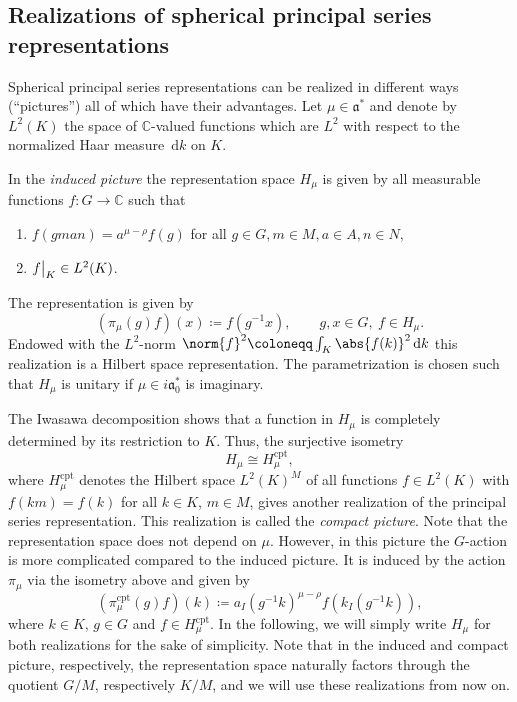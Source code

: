 \documentclass[JEP,XML,SOM,NoFloatCountersInSection,Unicode,published]{cedram}
\theoremstyle{definition}
\DeclarePairedDelimiter{\abs}\lvert\rvert
\DeclarePairedDelimiter{\norm}\lVert\rVert
\newcommand\restr[2]{{
\left.\kern-\nulldelimiterspace
#1
\vphantom{\big|}
\right|_{#2}
}}
\newcommand{\mf}[1]{\ensuremath{\mathfrak{#1}}}
\newcommand{\rhoa}{\ensuremath{\rho}}
\newcommand{\C}{\ensuremath{\mathbb{C}}}
\newcommand{\ps}[2]{\ensuremath{H_{#2}}}
\newcommand{\psc}[2]{\ensuremath{H_{#2}^{\mathrm{cpt}}}}
\newcommand{\intd}{\ensuremath{\,\mathrm{d}}}
\begin{document}
\subsection{Realizations of spherical principal series representations}
Spherical principal series representations can be realized in different ways (``pictures'') all of which have their advantages. Let $\mu\in\mf a^*$ and denote by $L^2(K)$ the space of $\C$-valued functions which are $L^2$ with respect to the normalized Haar measure $\intd k$ on $K$.

In the \emph{induced picture} the representation space $\ps{\sigma}{\mu}$ is given by all measurable functions $f:G\to \C$ such that
\begin{enumerate}
\item $f(gman)=a^{\mu-\rhoa}f(g)$ for all $g\in G,m\in M,a\in A,n\in N$,
\item $\restr{f}{K}\in L^2(K)$.
\end{enumerate}
The representation is given by
\[
(\pi_{\mu}(g)f)(x)\coloneqq f(g^{-1}x),\qquad g,x\in G,\ f\in \ps{\sigma}{\mu}.
\]
Endowed with the $L^2$-norm $\norm{f}^2\coloneqq\int_K\abs{f(k)}^2\intd k$ this realization is a Hilbert space representation. The parametrization is chosen such that $\ps{\sigma}{\mu}$ is unitary if $\mu\in i\mf a_0^*$ is imaginary.

The Iwasawa decomposition shows that a function in $\ps{\sigma}{\mu}$ is completely determined by its restriction to $K$. Thus, the surjective isometry
\begin{equation}\label{eq:cpt_induced}
\ps{\sigma}{\mu}\cong\psc{\sigma}{\mu},
\end{equation}
where $\psc{\sigma}{\mu}$ denotes the Hilbert space $L^2(K)^M$ of all functions $f\in L^2(K)$ with $f(km)=f(k)$ for all $k\in K$, $m\in M$, gives another realization of the principal series representation. This realization is called the \emph{compact picture}. Note that the representation space does not depend on $\mu$. However, in this picture the $G$-action is more complicated compared to the induced picture. It is induced by the action $\pi_{\mu}$ via the isometry above and given by
\begin{equation}\label{eq:action_cpt_picture}
(\pi_{\mu}^{\mathrm{cpt}}(g)f)(k)\coloneqq a_{I}(g^{-1}k)^{\mu-\rhoa}f(k_{I}(g^{-1}k)),
\end{equation}
where $k\in K$, $g\in G$ and $f\in\psc{\sigma}{\mu}$. In the following, we will simply write $\ps{\sigma}{\mu}$ for both realizations for the sake of simplicity. Note that in the induced and compact picture, respectively, the representation space naturally factors through the quotient $G/M$, respectively $K/M$, and we will use these realizations from now on.
\end{document}
